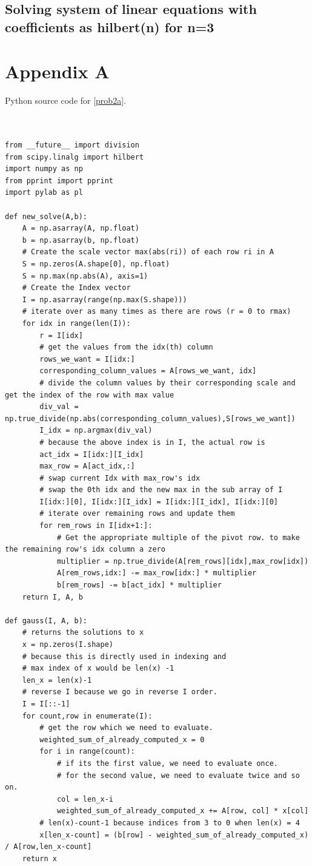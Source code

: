 \documentclass[a4paper,11pt]{article}
\begin{document}
\subsection{Solving system of linear equations with coefficients as hilbert(n) for n=3}

\clearpage
\section{Appendix A}\label{code:problem2a}
Python source code for \ref{prob2a}.
{\footnotesize
\begin{lstlisting}


from __future__ import division
from scipy.linalg import hilbert
import numpy as np
from pprint import pprint
import pylab as pl

def new_solve(A,b):
    A = np.asarray(A, np.float)
    b = np.asarray(b, np.float)
    # Create the scale vector max(abs(ri)) of each row ri in A
    S = np.zeros(A.shape[0], np.float)
    S = np.max(np.abs(A), axis=1)
    # Create the Index vector
    I = np.asarray(range(np.max(S.shape)))
    # iterate over as many times as there are rows (r = 0 to rmax)
    for idx in range(len(I)):
        r = I[idx]
        # get the values from the idx(th) column
        rows_we_want = I[idx:]
        corresponding_column_values = A[rows_we_want, idx]
        # divide the column values by their corresponding scale and get the index of the row with max value
        div_val = np.true_divide(np.abs(corresponding_column_values),S[rows_we_want])
        I_idx = np.argmax(div_val)  
        # because the above index is in I, the actual row is
        act_idx = I[idx:][I_idx]
        max_row = A[act_idx,:]
        # swap current Idx with max_row's idx
        # swap the 0th idx and the new max in the sub array of I
        I[idx:][0], I[idx:][I_idx] = I[idx:][I_idx], I[idx:][0]
        # iterate over remaining rows and update them
        for rem_rows in I[idx+1:]:
            # Get the appropriate multiple of the pivot row. to make the remaining row's idx column a zero
            multiplier = np.true_divide(A[rem_rows][idx],max_row[idx])
            A[rem_rows,idx:] -= max_row[idx:] * multiplier
            b[rem_rows] -= b[act_idx] * multiplier
    return I, A, b

def gauss(I, A, b):
    # returns the solutions to x
    x = np.zeros(I.shape)
    # because this is directly used in indexing and
    # max index of x would be len(x) -1
    len_x = len(x)-1
    # reverse I because we go in reverse I order.
    I = I[::-1]
    for count,row in enumerate(I):
        # get the row which we need to evaluate.
        weighted_sum_of_already_computed_x = 0
        for i in range(count):
            # if its the first value, we need to evaluate once.
            # for the second value, we need to evaluate twice and so on.
            col = len_x-i
            weighted_sum_of_already_computed_x += A[row, col] * x[col]
        # len(x)-count-1 because indices from 3 to 0 when len(x) = 4
        x[len_x-count] = (b[row] - weighted_sum_of_already_computed_x) / A[row,len_x-count]
    return x


\end{lstlisting}}
\end{document}
